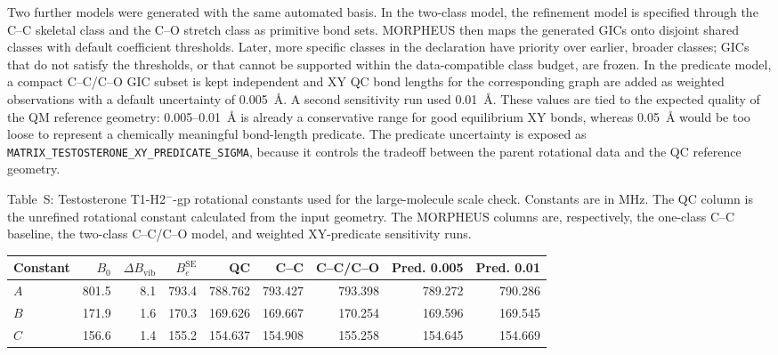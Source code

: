 \documentclass[12pt]{article}
\renewcommand{\thetable}{S\arabic{table}}
\begin{document}
Two further models were generated with the same automated basis. In the
two-class model, the refinement model is specified through the C--C skeletal
class and the C--O stretch class as primitive bond sets. MORPHEUS then maps the
generated GICs onto disjoint shared classes with default coefficient
thresholds. Later, more specific classes in the declaration have priority over
earlier, broader classes; GICs that do not satisfy the thresholds, or that
cannot be supported within the data-compatible class budget, are frozen. In the
predicate model, a compact C--C/C--O GIC subset is kept independent and XY QC
bond lengths for the corresponding graph are added as weighted observations
with a default uncertainty of 0.005~\AA{}. A second sensitivity run used
0.01~\AA{}. These values are tied to the expected quality of the QM reference
geometry: 0.005--0.01~\AA{} is already a conservative range for good
equilibrium XY bonds, whereas 0.05~\AA{} would be too loose to represent a
chemically meaningful bond-length predicate. The predicate uncertainty is
exposed as \texttt{MATRIX\_TESTOSTERONE\_XY\_PREDICATE\_SIGMA}, because it
controls the tradeoff between the parent rotational data and the QC reference
geometry.

\begin{center}
\label{tab:si-testosterone-rotconstants}
\parbox{0.94\linewidth}{\small Table~\thetable: Testosterone T1-H2$^{-}$-gp
rotational constants used for the large-molecule scale check. Constants are in
MHz. The QC column is the unrefined rotational constant calculated from the
input geometry. The MORPHEUS columns are, respectively, the one-class C--C
baseline, the two-class C--C/C--O model, and weighted XY-predicate sensitivity
runs.}

\smallskip
\footnotesize
\setlength{\tabcolsep}{3pt}
\begin{tabular}{lrrrrrrrr}
\toprule
Constant & $B_0$ & $\Delta B_\mathrm{vib}$ & $B_e^\mathrm{SE}$ & QC & C--C & C--C/C--O & Pred. 0.005 & Pred. 0.01 \\
\midrule
$A$ & 801.5 & 8.1 & 793.4 & 788.762 & 793.427 & 793.398 & 789.272 & 790.286 \\
$B$ & 171.9 & 1.6 & 170.3 & 169.626 & 169.667 & 170.254 & 169.596 & 169.545 \\
$C$ & 156.6 & 1.4 & 155.2 & 154.637 & 154.908 & 155.258 & 154.645 & 154.669 \\
\bottomrule
\end{tabular}
\end{center}
\end{document}
